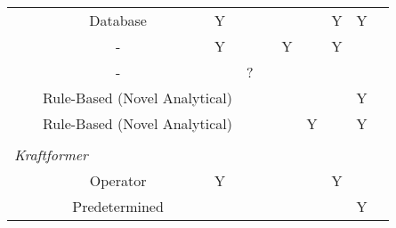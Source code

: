 \begin{tabular}{ccccccccccc}
               & \citep{Mori1998IncrementalDatabase}                                                                             & Database                         & Y              &            &           &           &               & Y          & Y            &           \\
               & \citep{Tanaka2014DevelopmentHammering}                                                                          & -                                & Y              &            &           & Y         &               & Y          &              &           \\
               & \citep{Sharon2014FraunhoferReport}                                                                              & -                                &                & ?          &           &           &               &            &              &           \\
               & \citep{Wang2017IncrementalPath,Zhu2019ToolForming,Schafer2005IncrementalRobots,Puzik2008IncrementalApplication} & \multicolumn{2}{l}{Rule-Based (Novel Analytical)} &            &           &           &               &            & Y            &           \\
               & \citep{Luo2010ASimulation}                                                                                      & \multicolumn{2}{l}{Rule-Based (Novel Analytical)} &            &           &           & Y             &            & Y            &           \\
               &                                                                                                         &                                  &                &            &           &           &               &            &              &           \\
\multicolumn{11}{l}{\textit{Kraftformer}} \\
               & \citep{Scherer2010DrivingProducts}                                                                              & Operator                         & Y              &            &           &           &               & Y          &              &           \\
               & \citep{Hoffman2009AnHandling}                                                                                   & Predetermined                    &                &            &           &           &               &            & Y            &           \\

\end{tabular}
